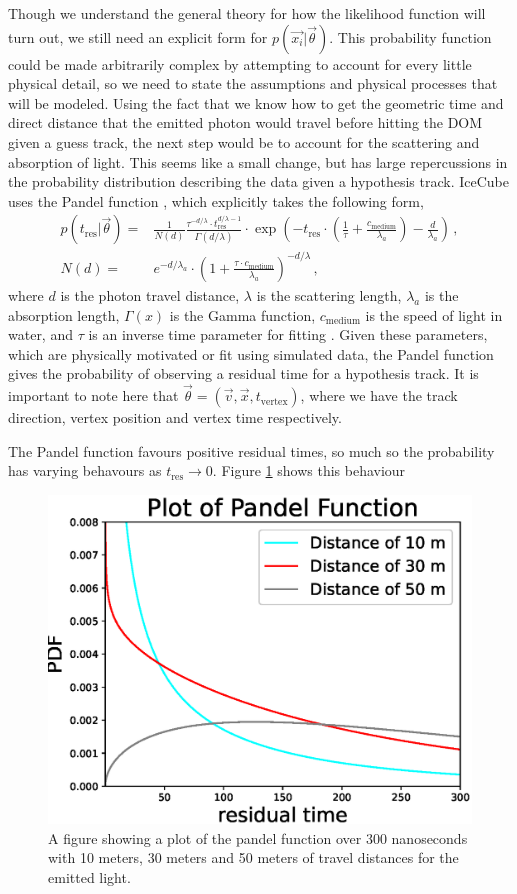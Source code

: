 Though we understand the general theory for how the likelihood function will turn out, we still need an explicit form for $p\left(\vec{x_{i}}\bigr\rvert\vec{\theta}\right)$. This probability function could be made arbitrarily complex by attempting to account for every little physical detail, so we need to state the assumptions and physical processes that will be modeled. Using the fact that we know how to get the geometric time and direct distance that the emitted photon would travel before hitting the DOM given a guess track, the next step would be to account for the scattering and absorption of light. This seems like a small change, but has large repercussions in the probability distribution describing the data given a hypothesis track. IceCube uses the Pandel function \cite{phd_kai}, which explicitly takes the following form,
\begin{equation}\label{eq:pandel}
  \begin{split}
    p\left(t_{\text{res}}\bigr\rvert\vec{\theta}\right) = & \frac{1}{N(d)}\frac{\tau^{-d/\lambda}\cdot t_{\text{res}}^{d/\lambda - 1}}{\Gamma(d/\lambda)}\cdot \exp\left(-t_{\text{res}}\cdot\left(\frac{1}{\tau} + \frac{c_{\text{medium}}}{\lambda_{a}}\right) - \frac{d}{\lambda_{a}}\right)\, , \\
    N(d) = & e^{-d/\lambda_{a}}\cdot\left(1 + \frac{\tau \cdot c_{\text{medium}}}{\lambda_{a}}\right)^{-d/\lambda}\, ,
  \end{split}
\end{equation}
where $d$ is the photon travel distance, $\lambda$ is the scattering length, $\lambda_{a}$ is the absorption length, $\Gamma(x)$ is the Gamma function, $c_{\text{medium}}$ is the speed of light in water, and $\tau$ is an inverse time parameter for fitting \cite{phd_kai}. Given these parameters, which are physically motivated or fit using simulated data, the Pandel function gives the probability of observing a residual time for a hypothesis track. It is important to note here that $\vec{\theta} = (\vec{v}, \vec{x}, t_{\text{vertex}})$, where we have the track direction, vertex position and vertex time respectively.

The Pandel function favours positive residual times, so much so the probability has varying behavours as $t_{\text{res}}\to 0$. Figure \ref{fig:pandel} shows this behaviour 

\begin{figure}[H]
  \centering
  \includegraphics[width=12cm]{./Figures/pandel_plot.eps}
  \caption{A figure showing a plot of the pandel function over 300 nanoseconds with 10 meters, 30 meters and 50 meters of travel distances for the emitted light. }
  \label{fig:pandel}
\end{figure}
